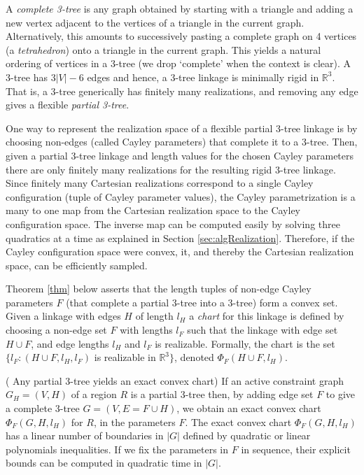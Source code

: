 A \emph{complete 3-tree} is any graph obtained by starting with a triangle and
adding a new vertex adjacent to the vertices of a triangle in the current
graph. Alternatively, this amounts to successively pasting a complete graph on
4 vertices (a \emph{tetrahedron}) onto a triangle in the current graph. This
yields a natural ordering of vertices in a 3-tree (we drop `complete' when the
context is clear). A 3-tree has $3|V| -6 $ edges and hence, a 3-tree linkage
is minimally rigid in $\mathbb{R}^3$. That is, a 3-tree generically has
finitely many realizations, and removing any edge gives a flexible
\emph{partial 3-tree}. 

One way to represent the realization space of a flexible partial 3-tree linkage
is by choosing non-edges (called Cayley parameters) that complete it to a
3-tree. Then, given a partial 3-tree linkage and length values for the chosen Cayley
parameters there are only finitely many realizations for the resulting rigid
3-tree linkage. Since finitely many Cartesian realizations correspond to a
single Cayley configuration (tuple of Cayley parameter values), the Cayley
parametrization is a many to one map from the Cartesian realization space to
the Cayley configuration space. The inverse map can be computed easily by
solving three quadratics at a time as explained in Section
\ref{sec:algRealization}. Therefore, if the Cayley configuration space were
convex, it, and thereby the Cartesian realization space, can be efficiently
sampled.


Theorem \ref{thm} below asserts that the length tuples of non-edge Cayley
parameters $F$ (that complete a partial 3-tree into a 3-tree) form a convex
set. Given a linkage with edges $H$ of length $l_H$ a \emph{chart} for this 
linkage is defined by choosing a non-edge set $F$ with lengths $l_F$ such that
the linkage with edge set $H \cup F$, and edge lengths $l_H$ and $l_F$ is realizable.
Formally, the chart is the set $\{l_F: (H\cup F, l_H, l_F)$ is
realizable in $\mathbb{R}^3\}$, denoted  $\Phi_F(H\cup F, l_H)$.


\begin{theorem}{(\cite{SiGa:2010} Any partial 3-tree yields an exact convex chart)}
\label{thm} 
If an active constraint graph $G_H = (V, H)$  of a region $R$ is a partial
3-tree then, by adding edge set $F$ to give a complete 3-tree $G = (V, E = F
\cup H)$, we obtain an exact convex chart $\Phi_F (G, H, l_H)$ for $R$, in the
parameters $F$.  The exact convex chart $\Phi_F (G, H, l_H)$ has a linear
number of boundaries in $|G|$ defined by quadratic or linear polynomials
inequalities. If we fix the parameters in $F$ in sequence, their explicit
bounds can be computed in quadratic time in $|G|$.
\end{theorem}


